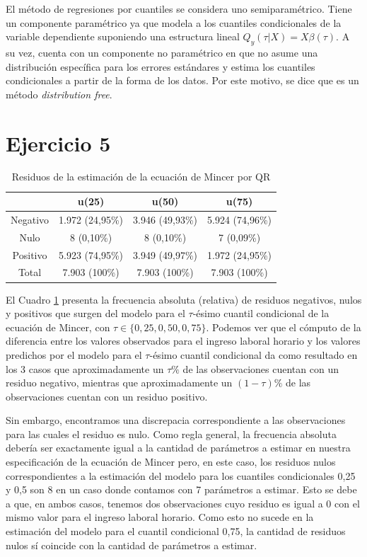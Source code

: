 \documentclass[12pt]{article}
\begin{document}
El método de regresiones por cuantiles se considera uno semiparamétrico. Tiene un componente paramétrico ya que modela a los cuantiles condicionales de la variable dependiente suponiendo una estructura lineal $Q_y(\tau | X ) = X \beta(\tau)$. A su vez, cuenta con un componente no paramétrico en que no asume una distribución específica para los errores estándares y estima los cuantiles condicionales a partir de la forma de los datos. Por este motivo, se dice que es un método \textit{distribution free}.

\section*{Ejercicio 5}

\begin{table}[H]
    \centering
     \caption{Residuos de la estimación de la ecuación de Mincer por QR}
    \begin{tabular}{|c|c|c|c|}
    \hline
         & \textbf{u(25)} & \textbf{u(50)} & \textbf{u(75)}\\ \hline
    Negativo & 1.972 (24,95\%) & 3.946 (49,93\%) & 5.924 (74,96\%) \\
    Nulo     & 8 (0,10\%) & 8 (0,10\%) & 7 (0,09\%) \\
    Positivo & 5.923 (74,95\%) & 3.949 (49,97\%) & 1.972 (24,95\%) \\ \hline
    Total    & 7.903 (100\%) & 7.903 (100\%) & 7.903 (100\%) \\ \hline
    \end{tabular}
    \label{tab:residuos_QR}
\end{table}

El Cuadro \ref{tab:residuos_QR} presenta la frecuencia absoluta (relativa) de residuos negativos, nulos y positivos que surgen del modelo para el $\tau$-ésimo cuantil condicional de la ecuación de Mincer, con $\tau\in\{0,25,0,50,0,75\}$. Podemos ver que el cómputo de la diferencia entre los valores observados para el ingreso laboral horario y los valores predichos por el modelo para el $\tau$-ésimo cuantil condicional da como resultado en los 3 casos que aproximadamente un $\tau\%$ de las observaciones cuentan con un residuo negativo, mientras que aproximadamente un $(1-\tau)\%$ de las observaciones cuentan con un residuo positivo. 

Sin embargo, encontramos una discrepacia correspondiente a las observaciones para las cuales el residuo es nulo. Como regla general, la frecuencia absoluta debería ser exactamente igual a la cantidad de parámetros a estimar en nuestra especificación de la ecuación de Mincer pero, en este caso, los residuos nulos correspondientes a la estimación del modelo para los cuantiles condicionales 0,25 y 0,5 son 8 en un caso donde contamos con 7 parámetros a estimar. Esto se debe a que, en ambos casos, tenemos dos observaciones cuyo residuo es igual a 0 con el mismo valor para el ingreso laboral horario. Como esto no sucede en la estimación del modelo para el cuantil condicional 0,75, la cantidad de residuos nulos sí coincide con la cantidad de parámetros a estimar.
\end{document}
